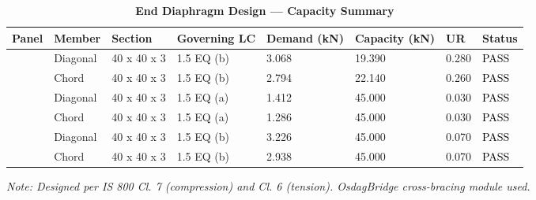 \begin{longtable}{|C{2.0cm}|L{1.8cm}|C{2.2cm}|C{3.0cm}|C{1.8cm}|C{1.8cm}|C{1.2cm}|C{1.8cm}|}
\caption{\textbf{End Diaphragm Design --- Capacity Summary}}
\hline
\textbf{Panel} & \textbf{Member} & \textbf{Section} & \textbf{Governing LC} & \textbf{Demand (kN)} & \textbf{Capacity (kN)} & \textbf{UR} & \textbf{Status} \\[6pt]
\hline
{} & Diagonal & 40 x 40 x 3 & 1.5 EQ (b) & 3.068 & 19.390 & 0.280 & \textcolor{black}{PASS} \\[6pt]
 & Chord & 40 x 40 x 3 & 1.5 EQ (b) & 2.794 & 22.140 & 0.260 & \textcolor{black}{PASS} \\[6pt]
\hline
{} & Diagonal & 40 x 40 x 3 & 1.5 EQ (a) & 1.412 & 45.000 & 0.030 & \textcolor{black}{PASS} \\[6pt]
 & Chord & 40 x 40 x 3 & 1.5 EQ (a) & 1.286 & 45.000 & 0.030 & \textcolor{black}{PASS} \\[6pt]
\hline
{} & Diagonal & 40 x 40 x 3 & 1.5 EQ (b) & 3.226 & 45.000 & 0.070 & \textcolor{black}{PASS} \\[6pt]
 & Chord & 40 x 40 x 3 & 1.5 EQ (b) & 2.938 & 45.000 & 0.070 & \textcolor{black}{PASS} \\[6pt]
\hline
\end{longtable}
\noindent\textit{Note: Designed per IS 800 Cl. 7 (compression) and Cl. 6 (tension). OsdagBridge cross-bracing module used.}

